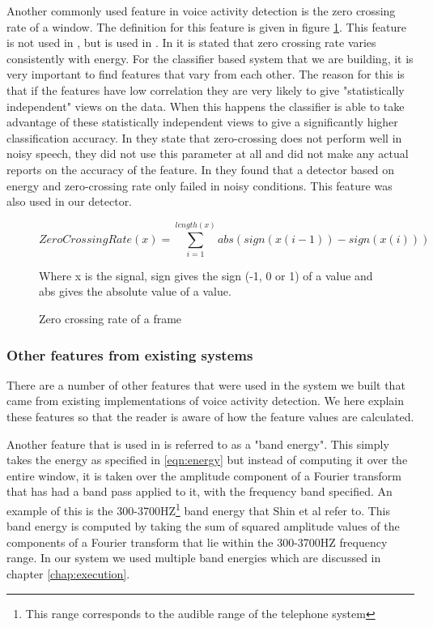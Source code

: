 \documentclass[ %
                    author={Sam Phippen},
                supervisor={Dr. Rafal Bogacz},
                     title={Real time voice activity detectors in noisy personal computing environments},
                  subtitle={},
                    degree={MEng},
                      year={2012} ]{thesis}
\begin{document}
Another commonly used feature in voice activity detection is the zero crossing
rate of a window. The definition for this feature is given in figure
\ref{eqn:zero-crossing-rate}. This feature is not used in \cite{shin}, but is
used in \cite{atal}. In \cite{atal} it is stated that zero crossing rate varies
consistently with energy. For the classifier based system that we are building,
it is very important to find features that vary from each other. The reason for
this is that if the features have low correlation they are very likely to give
"statistically independent" views on the data. When this happens the classifier
is able to take advantage of these statistically independent views to give a
significantly higher classification accuracy. In \cite{shin} they state that
zero-crossing does not perform well in noisy speech, they did not use this
parameter at all and did not make any actual reports on the accuracy of the
feature. In \cite{haigh} they found that a detector based on energy and
zero-crossing rate only failed in noisy conditions. This feature was also used
in our detector.

\begin{figure}

    $$ZeroCrossingRate(x) =
    \sum_{i=1}^{length(x)}abs(sign(x(i-1))-sign(x(i)))$$

    \label{eqn:zero-crossing-rate}

    Where x is the signal, sign gives the sign (-1, 0 or 1) of a value and
    abs gives the absolute value of a value.

    \caption{Zero crossing rate of a frame} \end{figure}

\subsubsection{Other features from existing systems}

There are a number of other features that were used in the system we built that
came from existing implementations of voice activity detection. We here explain
these features so that the reader is aware of how the feature values are
calculated.

Another feature that is used in \cite{shin} is referred to as a "band energy".
This simply takes the energy as specified in \ref{eqn:energy} but instead of
computing it over the entire window, it is taken over the amplitude component
of a Fourier transform that has had a band pass applied to it, with the
frequency band specified.  An example of this is the 300-3700HZ\footnote{This
range corresponds to the audible range of the telephone system} band energy
that Shin et al refer to. This band energy is computed by taking the sum of
squared amplitude values of the components of a Fourier transform that lie
within the 300-3700HZ frequency range. In our system we used multiple band
energies which are discussed in chapter \ref{chap:execution}.
\end{document}

